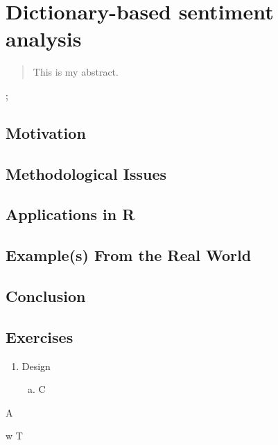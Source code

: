 	\chapter{Dictionary-based sentiment analysis}\label{ch:topic1}
	
	\begin{abstract}
		This is my abstract.
	\end{abstract}
	
	\begin{goals}
		\item ;
	\end{goals}
	
	\section{Motivation}

	\section{Methodological Issues}

	\section{Applications in R}\label{sec:applicationsinR}

	\section{Example(s) From the Real World}\label{sec:examplerealworld}

	\section{Conclusion}

	\section{Exercises}
	\begin{enumerate}[(1)]
		\item Design 
		\begin{enumerate}[a)]
			\item C
		\end{enumerate}
	\end{enumerate}
	
	
	\begin{testquestion}
		\item A
	\end{testquestion}
	
	\begin{glossy}
		\item[w] T
	\end{glossy}
	